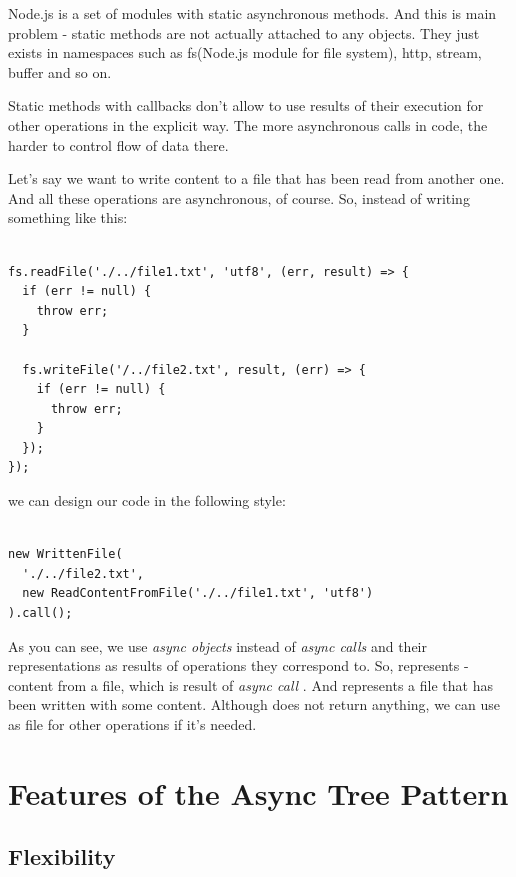 \documentclass{article}
\newcommand{\cit}[1]{{\fontfamily{qcr}\selectfont{\textit{\textcolor{superdarkgray}{#1}}}}}
\begin{document}
Node.js is a set of modules with static asynchronous methods. And this is main problem - static methods are not actually attached to any objects. They just exists in namespaces such as fs(Node.js module for file system), http, stream, buffer and so on.

Static methods with callbacks don't allow to use results of their execution for other operations in the explicit way. The more asynchronous calls in code, the harder to control flow of data there.

Let's say we want to write content to a file that has been read from another one. And all these operations are asynchronous, of course. 
So, instead of writing something like this:

\newpage

\begin{lstlisting}

fs.readFile('./../file1.txt', 'utf8', (err, result) => {
  if (err != null) {
    throw err;
  }
 
  fs.writeFile('/../file2.txt', result, (err) => {
    if (err != null) {
      throw err;
    }
  });
});

\end{lstlisting}

we can design our code in the following style:

\begin{lstlisting}

new WrittenFile(
  './../file2.txt',
  new ReadContentFromFile('./../file1.txt', 'utf8')
).call();

\end{lstlisting}

As you can see, we use \textit{async objects} instead of \textit{async calls} and their representations as results of operations they correspond to. So, \cit{ReadContentFromFile} represents \cit{string} - content from a file, which is result of \textit{async call} \cit{fs.readFile}. And \cit{WrittenFile} represents a file that has been written with some content. Although \cit{fs.WriteFile} does not return anything, we can use \cit{WrittenFile} as file for other operations if it's needed.

\section{Features of the Async Tree Pattern}

\subsection{Flexibility}
\end{document}
